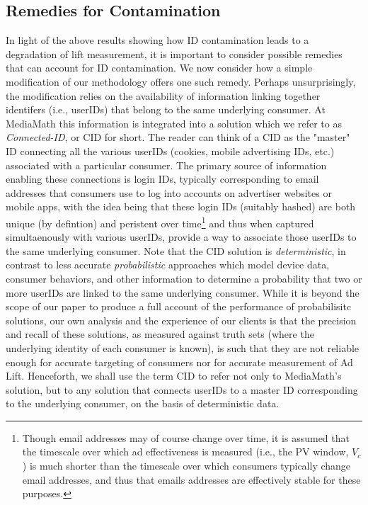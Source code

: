 \documentclass[11pt,a4paper]{article}
\theoremstyle{definition}
\theoremstyle{remark}
\theoremstyle{definition}
\theoremstyle{definition}
\theoremstyle{definition}
\theoremstyle{definition}
\theoremstyle{definition}
\theoremstyle{definition}
\begin{document}
\subsection{Remedies for Contamination}
In light of the above results showing how ID contamination leads to a degradation of lift measurement,  it is important to consider possible remedies that can account for ID contamination. We now consider how a simple modification of our methodology offers one such remedy. Perhaps unsurprisingly, the modification relies on the availability of information linking together identifers (i.e., userIDs) that belong to the same underlying consumer. At MediaMath this information is integrated into a solution which we refer to as \textit{Connected-ID}, or CID for short. The reader can think of a CID as the "master" ID connecting all the various userIDs (cookies, mobile advertising IDs, etc.) associated with a particular consumer. The primary source of information enabling these connections is login IDs, typically corresponding to email addresses that consumers use to log into accounts on advertiser websites or mobile apps, with the idea being that these login IDs (suitably hashed) are both unique (by defintion) and peristent over time\footnote{Though email addresses may of course change over time, it is assumed that the timescale over which ad effectiveness is measured (i.e., the PV window, $V_c$) is much shorter than the timescale over which consumers typically change email addresses, and thus that emails addresses are effectively stable for these purposes.} and thus when captured simultaenously with various userIDs, provide a way to associate those userIDs to the same underlying consumer. Note that the CID solution is \textit{deterministic}, in contrast to less accurate \textit{probabilistic} approaches which model device data, consumer behaviors, and other information to determine a probability that two or more userIDs are linked to the same underlying consumer. While it is beyond the  scope of our paper to produce a full account of the performance of probabilisitc solutions, our own analysis and the experience of our clients is that the precision and recall of these solutions, as measured against truth sets (where the underlying identity of each consumer is known), is such that they are not reliable enough for accurate targeting of consumers nor for accurate measurement of Ad Lift. Henceforth, we shall use the term CID to refer not only to MediaMath's solution, but to any solution that connects userIDs to a master ID corresponding to the underlying consumer, on the basis of deterministic data.
\end{document}
